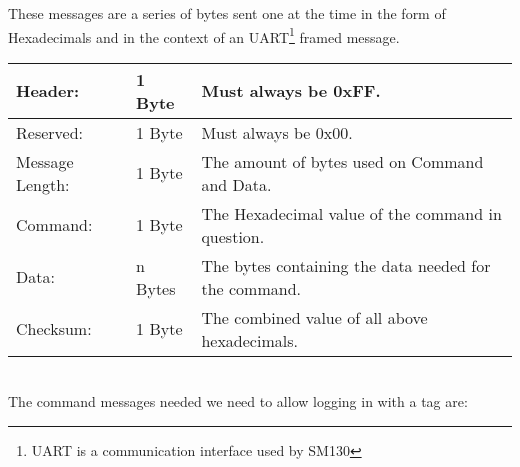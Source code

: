 These messages are a series of bytes sent one at the time in the form of Hexadecimals and in the context of an UART\footnote{UART is a communication interface used by SM130} framed message. \newline
\begin{tabular}{|l|l|p{7cm}|}
\hline \hline
Header: & 1 Byte & Must always be 0xFF.\\ \hline
Reserved: & 1 Byte & Must always be 0x00.\\ \hline
Message Length: & 1 Byte & The amount of bytes used on Command and Data.\\ \hline
Command: & 1 Byte & The Hexadecimal value of the command in question.\\ \hline
Data: & n Bytes & The bytes containing the data needed for the command.\\ \hline
Checksum: & 1 Byte & The combined value of all above hexadecimals.\\ \hline
\end{tabular} \\
The command messages needed we need to allow logging in with a tag are: 
